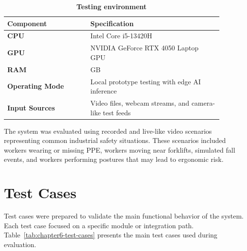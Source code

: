 \begin{table}[H]
\centering
\renewcommand{\arraystretch}{1.65}
\begin{tabular}{|>{\centering\arraybackslash}p{0.34\linewidth}|>{\centering\arraybackslash}p{0.54\linewidth}|}
\hline
\textbf{Component} & \textbf{Specification} \\
\hline
\textbf{CPU} & Intel Core i5-13420H \\
\hline
\textbf{GPU} & NVIDIA GeForce RTX 4050 Laptop GPU \\
\hline
\textbf{RAM} & 16 GB \\
\hline
\textbf{Operating Mode} & Local prototype testing with edge AI inference \\
\hline
\textbf{Input Sources} & Video files, webcam streams, and camera-like test feeds \\
\hline
\end{tabular}
\caption{\textbf{Testing environment}}
\label{tab:chapter6-testing-environment}
\end{table}

The system was evaluated using recorded and live-like video scenarios representing common industrial safety situations. These scenarios included workers wearing or missing PPE, workers moving near forklifts, simulated fall events, and workers performing postures that may lead to ergonomic risk.

\section{Test Cases}

Test cases were prepared to validate the main functional behavior of the system. Each test case focused on a specific module or integration path. Table~\ref{tab:chapter6-test-cases} presents the main test cases used during evaluation.

